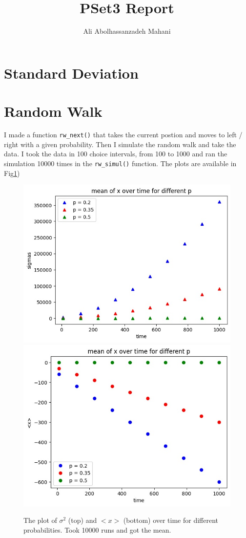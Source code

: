 \documentclass[12pt]{article}
\title{PSet3 Report}
\author{Ali Abolhassanzadeh Mahani}
\begin{document}
	\maketitle
	\section{Standard Deviation}
	\section{Random Walk}
	I made a function \texttt{rw\_next()} that takes the current postion and moves to left / right 
	with a given probability.
	Then I simulate the random walk and take the data. I took the data in 100 choice intervals, from
	100 to 1000 and ran the simulation 10000 times in the \texttt{rw\_simul()} function.
	The plots are available in Fig\ref{fig:rw_sim})
	\begin{figure}[h!]
		\centering
		\includegraphics[width=0.9\linewidth]{../p2/sigmas.jpg}
		\includegraphics[width=0.9\linewidth]{../p2/x_means.jpg}
		\label{fig:rw_sim}
		\caption{The plot of $\sigma^2$ (top) and $<x>$ (bottom) over time for different probabilities. Took 10000 runs and got the mean.}
	\end{figure} 
\end{document}
